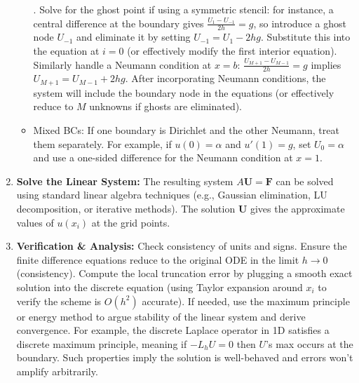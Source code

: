 \documentclass[a4paper,11pt]{article}
\begin{document}
\begin{enumerate}
\begin{itemize}
                    \cite{leifh}. Solve for the ghost point if using a symmetric stencil: for instance, a central difference at the boundary gives $\frac{U_1 - U_{-1}}{2h} = g$, so introduce a ghost node $U_{-1}$ and eliminate it by setting $U_{-1} = U_1 - 2hg$. Substitute this into the equation at $i=0$ (or effectively modify the first interior equation). Similarly handle a Neumann condition at $x=b$: $\frac{U_{M+1}-U_{M-1}}{2h}=g$ implies $U_{M+1}=U_{M-1}+2hg$. After incorporating Neumann conditions, the system will include the boundary node in the equations (or effectively reduce to $M$ unknowns if ghosts are eliminated).
              \item Mixed BCs: If one boundary is Dirichlet and the other Neumann, treat them separately. For example, if $u(0)=\alpha$ and $u'(1)=g$, set $U_0=\alpha$ and use a one-sided difference for the Neumann condition at $x=1$.
          \end{itemize}
    \item \textbf{Solve the Linear System:} The resulting system $A\mathbf{U} = \mathbf{F}$ can be solved using standard linear algebra techniques (e.g., Gaussian elimination, LU decomposition, or iterative methods). The solution $\mathbf{U}$ gives the approximate values of $u(x_i)$ at the grid points.
    \item \textbf{Verification \& Analysis:} Check consistency of units and signs. Ensure the finite difference equations reduce to the original ODE in the limit $h\to 0$ (consistency). Compute the local truncation error by plugging a smooth exact solution into the discrete equation (using Taylor expansion around $x_i$ to verify the scheme is $O(h^2)$ accurate). If needed, use the maximum principle or energy method to argue stability of the linear system and derive convergence. For example, the discrete Laplace operator in 1D satisfies a discrete maximum principle, meaning if $-L_h U = 0$ then $U$’s max occurs at the boundary. Such properties imply the solution is well-behaved and errors won’t amplify arbitrarily.
\end{enumerate}
\end{document}
